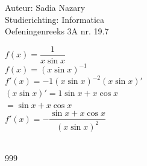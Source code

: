 \documentclass[a4paper]{article}
\begin{document}
\noindent \large Auteur: Sadia Nazary \\
\noindent \large Studierichting: Informatica \\
\noindent \large Oefeningenreeks 3A nr. 19.7 \\

\medskip

\normalsize

$f(x)=\dfrac{1}{x\sin x}$ \\

$f(x)=(x\sin x)^{-1}$ \\

$f'(x)=-1(x\sin x)^{-2}(x\sin x)'$ \\

$(x\sin x)'=1\sin x+x\cos x$ \\

$=\sin x+x\cos x$ \\

$f'(x)=-\dfrac{\sin x+x\cos x}{(x\sin x)^2}$ \\

 \\

\begin{thebibliography}{999}
\end{thebibliography}
\end{document}
